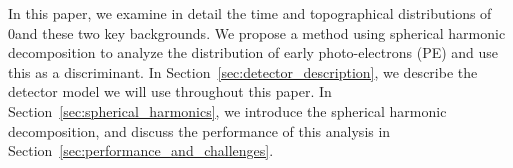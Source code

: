 In this paper, we examine in detail the time and topographical distributions of 0\nbb and these two key backgrounds. We propose a method using spherical harmonic decomposition to analyze the distribution of early photo-electrons (PE) and use this as a discriminant. In Section~\ref{sec:detector_description}, we describe the detector model we will use throughout this paper. In Section~\ref{sec:spherical_harmonics}, we introduce the spherical harmonic decomposition, and discuss the performance of this analysis in Section~\ref{sec:performance_and_challenges}.



  
